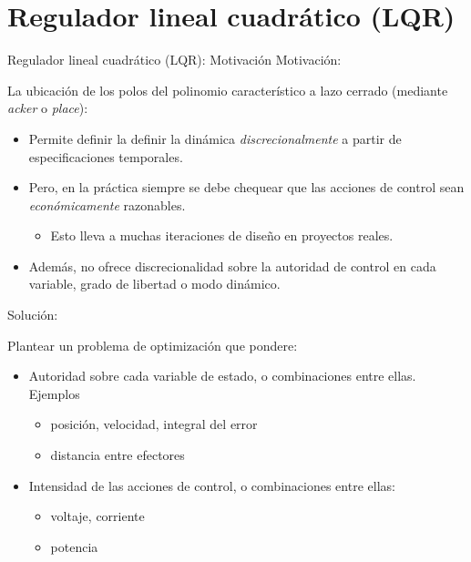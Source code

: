 \documentclass{beamer}
\begin{document}
\section{Regulador lineal cuadrático (LQR)} 
\tableofcontents[currentsection]
\begin{frame}{Regulador lineal cuadrático (LQR): Motivación}
Motivación:

La ubicación de los polos del polinomio característico a lazo cerrado (mediante \emph{acker} o \emph{place}):
\begin{itemize}
    \item Permite definir la definir la dinámica \emph{discrecionalmente} a partir de especificaciones temporales.
    \item Pero, en la práctica siempre se debe chequear que las acciones de control sean \emph{económicamente} razonables.
    \begin{itemize}
        \item Esto lleva a muchas iteraciones de diseño en proyectos reales.
    \end{itemize} 
    \item Además, no ofrece discrecionalidad sobre la autoridad de control en cada variable, grado de libertad o modo dinámico.
\end{itemize}

Solución:

Plantear un problema de optimización que pondere:
\begin{itemize}
    \item Autoridad sobre cada variable de estado, o combinaciones entre ellas. Ejemplos
    \begin{itemize}
        \item posición, velocidad, integral del error
        \item distancia entre efectores
    \end{itemize}
    \item Intensidad de las acciones de control, o combinaciones entre ellas:
    \begin{itemize}
        \item voltaje, corriente
        \item potencia
    \end{itemize}
\end{itemize}
\end{frame}
\end{document}
